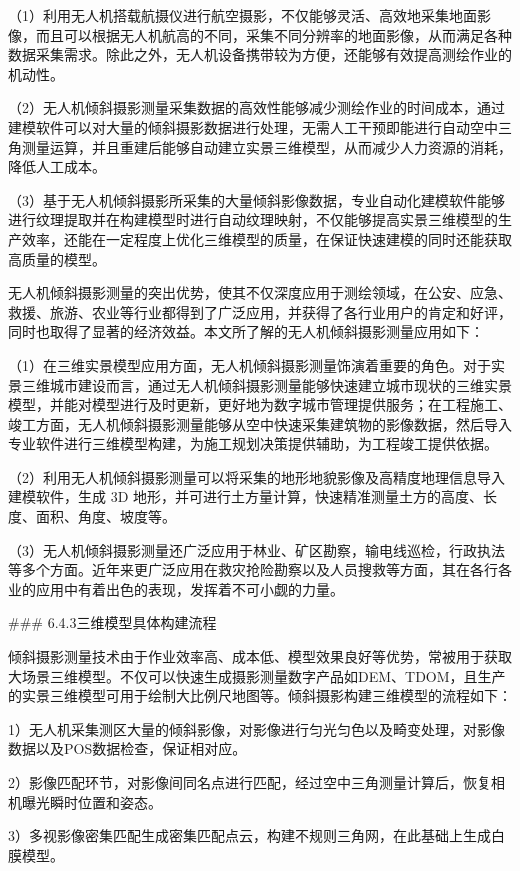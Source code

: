 （1）利用无人机搭载航摄仪进行航空摄影，不仅能够灵活、高效地采集地面影像，而且可以根据无人机航高的不同，采集不同分辨率的地面影像，从而满足各种数据采集需求。除此之外，无人机设备携带较为方便，还能够有效提高测绘作业的机动性。

（2）无人机倾斜摄影测量采集数据的高效性能够减少测绘作业的时间成本，通过建模软件可以对大量的倾斜摄影数据进行处理，无需人工干预即能进行自动空中三角测量运算，并且重建后能够自动建立实景三维模型，从而减少人力资源的消耗，降低人工成本。

（3）基于无人机倾斜摄影所采集的大量倾斜影像数据，专业自动化建模软件能够进行纹理提取并在构建模型时进行自动纹理映射，不仅能够提高实景三维模型的生产效率，还能在一定程度上优化三维模型的质量，在保证快速建模的同时还能获取高质量的模型。

无人机倾斜摄影测量的突出优势，使其不仅深度应用于测绘领域，在公安、应急、救援、旅游、农业等行业都得到了广泛应用，并获得了各行业用户的肯定和好评，同时也取得了显著的经济效益。本文所了解的无人机倾斜摄影测量应用如下：

（1）在三维实景模型应用方面，无人机倾斜摄影测量饰演着重要的角色。对于实景三维城市建设而言，通过无人机倾斜摄影测量能够快速建立城市现状的三维实景模型，并能对模型进行及时更新，更好地为数字城市管理提供服务；在工程施工、竣工方面，无人机倾斜摄影测量能够从空中快速采集建筑物的影像数据，然后导入专业软件进行三维模型构建，为施工规划决策提供辅助，为工程竣工提供依据。

（2）利用无人机倾斜摄影测量可以将采集的地形地貌影像及高精度地理信息导入建模软件，生成 3D 地形，并可进行土方量计算，快速精准测量土方的高度、长度、面积、角度、坡度等。

（3）无人机倾斜摄影测量还广泛应用于林业、矿区勘察，输电线巡检，行政执法等多个方面。近年来更广泛应用在救灾抢险勘察以及人员搜救等方面，其在各行各业的应用中有着出色的表现，发挥着不可小觑的力量。

\#\#\# 6.4.3三维模型具体构建流程

倾斜摄影测量技术由于作业效率高、成本低、模型效果良好等优势，常被用于获取大场景三维模型。不仅可以快速生成摄影测量数字产品如DEM、TDOM，且生产的实景三维模型可用于绘制大比例尺地图等。倾斜摄影构建三维模型的流程如下：

1）无人机采集测区大量的倾斜影像，对影像进行匀光匀色以及畸变处理，对影像数据以及POS数据检查，保证相对应。

2）影像匹配环节，对影像间同名点进行匹配，经过空中三角测量计算后，恢复相机曝光瞬时位置和姿态。

3）多视影像密集匹配生成密集匹配点云，构建不规则三角网，在此基础上生成白膜模型。

